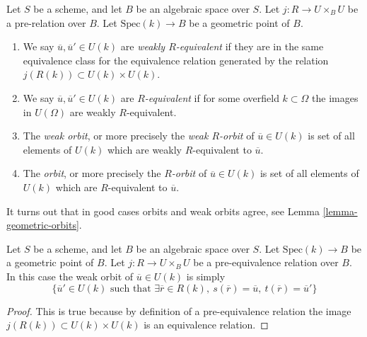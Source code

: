 \begin{definition}
\label{definition-geometric-orbits}
Let $S$ be a scheme, and let $B$ be an algebraic space over $S$.
Let $j : R \to U \times_B U$ be a pre-relation over $B$.
Let $\text{Spec}(k) \to B$ be a geometric point of $B$.
\begin{enumerate}
\item We say $\overline{u}, \overline{u}' \in U(k)$ are
{\it weakly $R$-equivalent} if they are in the same equivalence class
for the equivalence relation generated by the relation
$j(R(k)) \subset U(k) \times U(k)$.
\item We say $\overline{u}, \overline{u}' \in U(k)$ are
{\it $R$-equivalent} if for some overfield $k \subset \Omega$
the images in $U(\Omega)$ are weakly $R$-equivalent.
\item The {\it weak orbit}, or more precisely the {\it weak $R$-orbit}
of $\overline{u} \in U(k)$ is set of all
elements of $U(k)$ which are weakly $R$-equivalent to $\overline{u}$.
\item The {\it orbit}, or more precisely the {\it $R$-orbit}
of $\overline{u} \in U(k)$ is set of all
elements of $U(k)$ which are $R$-equivalent to $\overline{u}$.
\end{enumerate}
\end{definition}

\noindent
It turns out that in good cases orbits and weak orbits agree, see
Lemma \ref{lemma-geometric-orbits}.

\begin{lemma}
\label{lemma-weak-orbit-pre-equivalence}
Let $S$ be a scheme, and let $B$ be an algebraic space over $S$.
Let $\text{Spec}(k) \to B$ be a geometric point of $B$.
Let $j : R \to U \times_B U$ be a pre-equivalence relation over $B$.
In this case the weak orbit of $\overline{u} \in U(k)$ is simply
$$
\{
\overline{u}' \in U(k)
\text{ such that }
\exists \overline{r} \in R(k),
\ s(\overline{r}) = \overline{u},
\ t(\overline{r}) = \overline{u}'
\}
$$
\end{lemma}

\begin{proof}
This is true because by definition of a pre-equivalence relation the image
$j(R(k)) \subset U(k) \times U(k)$ is an equivalence relation.
\end{proof}

